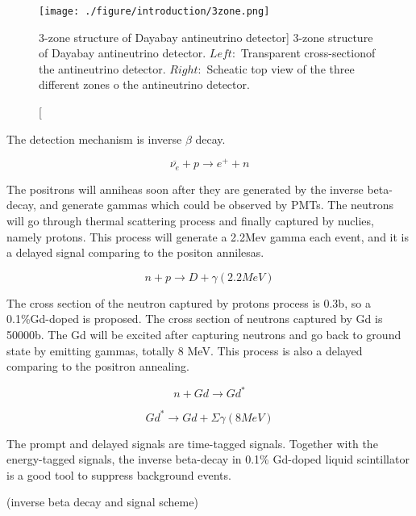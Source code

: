 \begin{figure}
    \centering
    \texttt{[image: ./figure/introduction/3zone.png]}
    \caption
    [3-zone structure of Dayabay antineutrino detector]
    {3-zone structure of Dayabay antineutrino detector. $Left:$ Transparent cross-sectionof the antineutrino detector.
$Right:$ Scheatic top view of the three different zones o the antineutrino detector.}
    \label{fig:3zone.png}
    \end{figure}


The detection mechanism is inverse $\beta$ decay.


\begin{equation}
\overline{\nu_e} + p \rightarrow e^+ + n
\label{InverseBetaDecay}
\end{equation}


The positrons will anniheas soon after they are generated by the inverse beta-decay,
and generate gammas which could be observed by PMTs. The neutrons will go through
thermal scattering process and finally captured by nuclies, namely protons. This
process will generate a 2.2Mev gamma each event, and it is a delayed signal comparing
to the positon annilesas.


\begin{equation}
n + p \rightarrow D + \gamma (2.2 MeV)
\label{NeutronPCapture}
\end{equation}


The cross section of the neutron captured by protons process is 0.3b, so a 0.1\%Gd-doped
is proposed. The cross section of neutrons captured by Gd is 50000b. The Gd will be excited
after capturing neutrons and go back to ground state by emitting gammas, totally 8 MeV. This
process is also a delayed comparing to the positron annealing.


\begin{equation}
n + Gd \rightarrow Gd^*
\label{NeutronGdCapture}
\end{equation}


\begin{equation}
Gd^* \rightarrow Gd + \Sigma \gamma (8 MeV)
\label{GdStarToGd}
\end{equation}


The prompt and delayed signals are time-tagged signals.
Together with the energy-tagged signals, the inverse beta-decay
in 0.1\% Gd-doped liquid scintillator is a good tool to suppress
background events.


(inverse beta decay and signal scheme)


